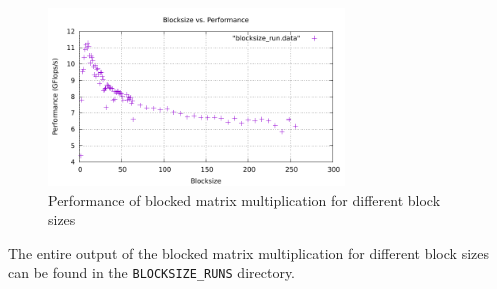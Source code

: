 \documentclass[unicode,11pt,a4paper,oneside,numbers=endperiod,openany]{scrartcl}
\begin{document}
\begin{figure}[h]
    \centering
    \includegraphics[width=0.7\textwidth]{../01b/BLOCKSIZE_RUNS/blocksize.pdf}
    \caption{Performance of blocked matrix multiplication for different block sizes}
    \label{fig:blocked_matrix_multiplication}
\end{figure}

The entire output of the blocked matrix multiplication for different block sizes can be found in the \texttt{BLOCKSIZE\_RUNS} directory.
\end{document}
